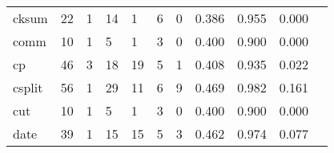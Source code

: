 \begin{longtable}{lp{1.2cm}p{1.2cm}p{1.2cm}p{1.2cm}p{1.2cm}p{1.2cm}p{1.2cm}p{1.2cm}p{1.2cm}p{1.2cm}}
cksum     &                                    22 &                                                  1 &                                                 14 &                                                  1 &                                                  6 &                                                  0 &                                         0.386 &                                              0.955 &                                              0.000 \\
comm      &                                    10 &                                                  1 &                                                  5 &                                                  1 &                                                  3 &                                                  0 &                                         0.400 &                                              0.900 &                                              0.000 \\
cp        &                                    46 &                                                  3 &                                                 18 &                                                 19 &                                                  5 &                                                  1 &                                         0.408 &                                              0.935 &                                              0.022 \\
csplit    &                                    56 &                                                  1 &                                                 29 &                                                 11 &                                                  6 &                                                  9 &                                         0.469 &                                              0.982 &                                              0.161 \\
cut       &                                    10 &                                                  1 &                                                  5 &                                                  1 &                                                  3 &                                                  0 &                                         0.400 &                                              0.900 &                                              0.000 \\
date      &                                    39 &                                                  1 &                                                 15 &                                                 15 &                                                  5 &                                                  3 &                                         0.462 &                                              0.974 &                                              0.077 \\

\end{longtable}
